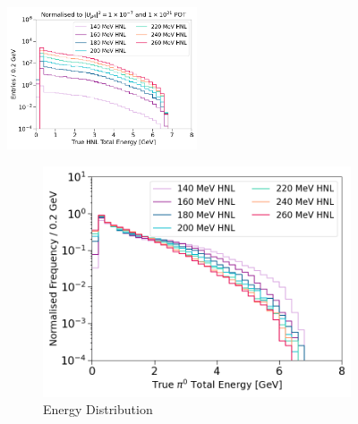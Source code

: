 \begin{figure}[t!] 
\centering    
\includegraphics[width=0.5\textwidth]{HNL_Energy_Spectrum}
\caption[Simulated HNL Fluxes at the Front Face of SBND]{
Simulated HNL fluxes at the front face of SBND.
}
\label{fig:HNL_Energy_Spectrum}

\vspace{0.5cm}
        \centering
        \begin{subfigure}[b]{0.495\textwidth}
            \centering
            \includegraphics[width=\textwidth]{pi0_energy}
            \caption{Energy Distribution}%
        \end{subfigure}
        \hfill
        \begin{subfigure}[b]{0.495\textwidth}  
            \centering 

\end{subfigure}
\end{figure}
